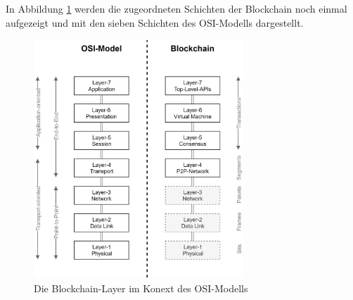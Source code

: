 In Abbildung \ref{fig:chapter02:osi_blockchain} werden die zugeordneten Schichten der Blockchain noch einmal aufgezeigt und mit den sieben Schichten des \ac{OSI}-Modells dargestellt.

\begin{figure}[htbp]
 \centering
 \includegraphics[width=0.7\textwidth]{gfx/osi_blockchain.png}
 \caption{Die Blockchain-Layer im Konext des OSI-Modells}
 \label{fig:chapter02:osi_blockchain}
\end{figure}

